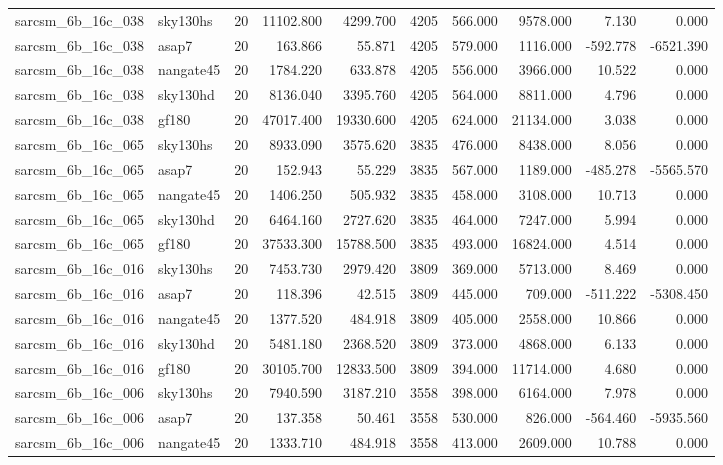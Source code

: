\documentclass{article}
\begin{document}
\begin{longtable}{llrrrrrrrr}
sarcsm\_6b\_16c\_038 & sky130hs & 20 & 11102.800 & 4299.700 & 4205 & 566.000 & 9578.000 & 7.130 & 0.000 \\
sarcsm\_6b\_16c\_038 & asap7 & 20 & 163.866 & 55.871 & 4205 & 579.000 & 1116.000 & -592.778 & -6521.390 \\
sarcsm\_6b\_16c\_038 & nangate45 & 20 & 1784.220 & 633.878 & 4205 & 556.000 & 3966.000 & 10.522 & 0.000 \\
sarcsm\_6b\_16c\_038 & sky130hd & 20 & 8136.040 & 3395.760 & 4205 & 564.000 & 8811.000 & 4.796 & 0.000 \\
sarcsm\_6b\_16c\_038 & gf180 & 20 & 47017.400 & 19330.600 & 4205 & 624.000 & 21134.000 & 3.038 & 0.000 \\
sarcsm\_6b\_16c\_065 & sky130hs & 20 & 8933.090 & 3575.620 & 3835 & 476.000 & 8438.000 & 8.056 & 0.000 \\
sarcsm\_6b\_16c\_065 & asap7 & 20 & 152.943 & 55.229 & 3835 & 567.000 & 1189.000 & -485.278 & -5565.570 \\
sarcsm\_6b\_16c\_065 & nangate45 & 20 & 1406.250 & 505.932 & 3835 & 458.000 & 3108.000 & 10.713 & 0.000 \\
sarcsm\_6b\_16c\_065 & sky130hd & 20 & 6464.160 & 2727.620 & 3835 & 464.000 & 7247.000 & 5.994 & 0.000 \\
sarcsm\_6b\_16c\_065 & gf180 & 20 & 37533.300 & 15788.500 & 3835 & 493.000 & 16824.000 & 4.514 & 0.000 \\
sarcsm\_6b\_16c\_016 & sky130hs & 20 & 7453.730 & 2979.420 & 3809 & 369.000 & 5713.000 & 8.469 & 0.000 \\
sarcsm\_6b\_16c\_016 & asap7 & 20 & 118.396 & 42.515 & 3809 & 445.000 & 709.000 & -511.222 & -5308.450 \\
sarcsm\_6b\_16c\_016 & nangate45 & 20 & 1377.520 & 484.918 & 3809 & 405.000 & 2558.000 & 10.866 & 0.000 \\
sarcsm\_6b\_16c\_016 & sky130hd & 20 & 5481.180 & 2368.520 & 3809 & 373.000 & 4868.000 & 6.133 & 0.000 \\
sarcsm\_6b\_16c\_016 & gf180 & 20 & 30105.700 & 12833.500 & 3809 & 394.000 & 11714.000 & 4.680 & 0.000 \\
sarcsm\_6b\_16c\_006 & sky130hs & 20 & 7940.590 & 3187.210 & 3558 & 398.000 & 6164.000 & 7.978 & 0.000 \\
sarcsm\_6b\_16c\_006 & asap7 & 20 & 137.358 & 50.461 & 3558 & 530.000 & 826.000 & -564.460 & -5935.560 \\
sarcsm\_6b\_16c\_006 & nangate45 & 20 & 1333.710 & 484.918 & 3558 & 413.000 & 2609.000 & 10.788 & 0.000 \\

\end{longtable}
\end{document}
